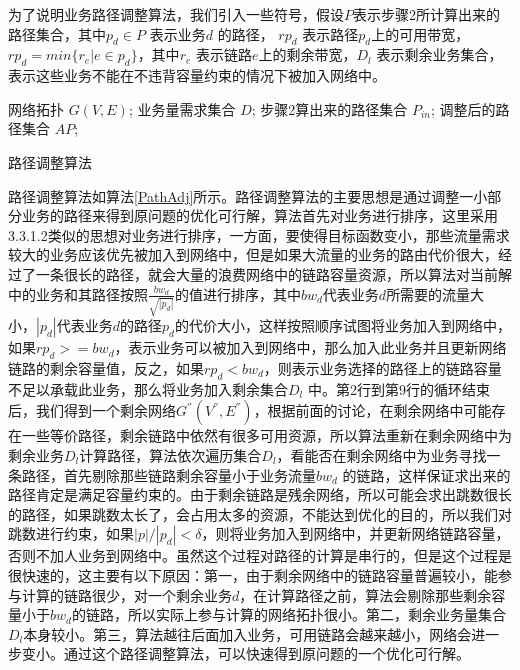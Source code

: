 为了说明业务路径调整算法，我们引入一些符号，假设$P$表示步骤2所计算出来的路径集合，其中$p_d\in P$ 表示业务$d$ 的路径， $rp_{d}$ 表示路径$p_d$上的可用带宽，$rp_{d} = min\{r_e | e\in p_d\}$，其中$r_e$ 表示链路$e$上的剩余带宽，$D_l$ 表示剩余业务集合，表示这些业务不能在不违背容量约束的情况下被加入网络中。
\begin{algorithm}[t]
\begin{algorithmic}[1]
\Require
网络拓扑 $G(V, E)$;
业务量需求集合 $D$;
步骤2算出来的路径集合 $P_{in}$;
\Ensure
调整后的路径集合 $AP$;
\Else
{}
\EndIf
\EndFor
{}
\EndIf
\EndFor
{}
\EndIf
\EndFor
\end{algorithmic}
\caption{路径调整算法}
\label{PathAdj}
\end{algorithm}

路径调整算法如算法\ref{PathAdj}所示。路径调整算法的主要思想是通过调整一小部分业务的路径来得到原问题的优化可行解，算法首先对业务进行排序，这里采用3.3.1.2类似的思想对业务进行排序，一方面，要使得目标函数变小，那些流量需求较大的业务应该优先被加入到网络中，但是如果大流量的业务的路由代价很大，经过了一条很长的路径，就会大量的浪费网络中的链路容量资源，所以算法对当前解中的业务和其路径按照$\frac{bw_d}{\sqrt{|p_d|}}$的值进行排序，其中${bw_d}$代表业务$d$所需要的流量大小，$|p_d|$代表业务$d$的路径$p_d$的代价大小，这样按照顺序试图将业务加入到网络中，如果$rp_d>=bw_d$，表示业务可以被加入到网络中，那么加入此业务并且更新网络链路的剩余容量值，反之，如果$rp_d<bw_d$，则表示业务选择的路径上的链路容量不足以承载此业务，那么将业务加入剩余集合$D_l$ 中。第2行到第9行的循环结束后，我们得到一个剩余网络$G^{''}(V^{''},E^{''})$，根据前面的讨论，在剩余网络中可能存在一些等价路径，剩余链路中依然有很多可用资源，所以算法重新在剩余网络中为剩余业务$D_l$计算路径，算法依次遍历集合$D_l$，看能否在剩余网络中为业务寻找一条路径，首先剔除那些链路剩余容量小于业务流量$bw_d$ 的链路，这样保证求出来的路径肯定是满足容量约束的。由于剩余链路是残余网络，所以可能会求出跳数很长的路径，如果跳数太长了，会占用太多的资源，不能达到优化的目的，所以我们对跳数进行约束，如果$|p|/|p_d|<\delta$，则将业务加入到网络中，并更新网络链路容量，否则不加人业务到网络中。虽然这个过程对路径的计算是串行的，但是这个过程是很快速的，这主要有以下原因：第一，由于剩余网络中的链路容量普遍较小，能参与计算的链路很少，对一个剩余业务$d$，在计算路径之前，算法会剔除那些剩余容量小于$bw_d$的链路，所以实际上参与计算的网络拓扑很小。第二，剩余业务量集合$D_l$本身较小。第三，算法越往后面加入业务，可用链路会越来越小，网络会进一步变小。通过这个路径调整算法，可以快速得到原问题的一个优化可行解。
